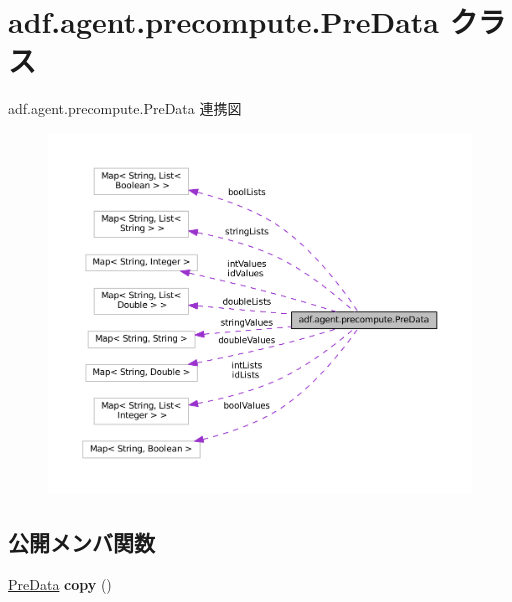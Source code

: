 \hypertarget{classadf_1_1agent_1_1precompute_1_1PreData}{}\section{adf.\+agent.\+precompute.\+Pre\+Data クラス}
\label{classadf_1_1agent_1_1precompute_1_1PreData}


adf.\+agent.\+precompute.\+Pre\+Data 連携図
\nopagebreak
\begin{figure}[H]
\begin{center}
\leavevmode
\includegraphics[width=350pt]{classadf_1_1agent_1_1precompute_1_1PreData__coll__graph}
\end{center}
\end{figure}
\subsection*{公開メンバ関数}
\begin{DoxyCompactItemize}
\item 
\hypertarget{classadf_1_1agent_1_1precompute_1_1PreData_ad6007344b7431ea23177008e654c0f57}{}\label{classadf_1_1agent_1_1precompute_1_1PreData_ad6007344b7431ea23177008e654c0f57} 
\hyperlink{classadf_1_1agent_1_1precompute_1_1PreData}{Pre\+Data} {\bfseries copy} ()
\end{DoxyCompactItemize}
